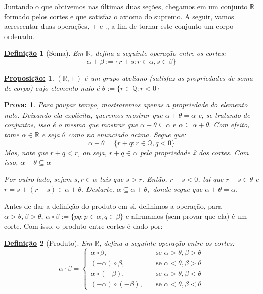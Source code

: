 \documentclass{article}
\newtheorem*{proposition*}{\underline{Proposi\c c\~ao:}}
\newtheorem{definition}{\underline{Defini\c c\~ao}}
\newtheorem*{proof*}{\underline{Prova:}}
\begin{document}
Juntando o que obtivemos nas \'ultimas duas se\c c\~oes, chegamos em um conjunto $\mathbb{R}$ formado pelos cortes e que satisfaz o axioma do supremo. A seguir, vamos acrescentar duas opera\c c\~oes, + e ., a fim de tornar este conjunto um corpo ordenado.

\begin{definition}[Soma]
Em $\mathbb{R}$, defina a seguinte opera\c c\~ao entre os cortes:
$$
\alpha + \beta:= \{r + s: r\in\alpha, s\in\beta\}
$$
\end{definition}
\begin{proposition*}
$(\mathbb{R}, +)$ \'e um grupo abeliano (satisfaz as propriedades de soma de corpo) cujo elemento nulo \'e $\theta:=\{r\in\mathbb{Q}: r < 0\}$
\end{proposition*}
\begin{proof*}
Para poupar tempo, mostraremos apenas a propriedade do elemento nulo. Deixando ela expl\'icita, queremos mostrar que $\alpha + \theta = \alpha$ e, se tratando de conjuntos, isso \'e o mesmo que mostrar que $\alpha + \theta \subseteq \alpha \text{ e } \alpha \subseteq \alpha + \theta.$ Com efeito, tome $\alpha\in\mathbb{R}$ e seja $\theta$ como no enunciado acima. Segue que:
$$
\alpha + \theta = \{r + q: r\in\mathbb{Q}, q < 0\}
$$
Mas, note que $r + q < r$, ou seja, $r + q\in\alpha$ pela propriedade 2 dos cortes. Com isso, $\alpha + \theta \subseteq \alpha$

Por outro lado, sejam $s, r\in\alpha$ tais que $s > r$. Ent\~ao, $r - s < 0$, tal que $r - s\in\theta$ e $r = s + (r - s) \in\alpha + \theta.$ Destarte, $\alpha\subseteq\alpha + \theta,$ donde segue que $\alpha + \theta = \alpha$. 
\end{proof*}

Antes de dar a defini\c c\~ao do produto em si, definimos a opera\c c\~ao, para $\alpha > \theta, \beta > \theta$, $\alpha\circ\beta:=\{pq: p\in\alpha, q\in\beta\}$ e afirmamos (sem provar que ela) \'e um corte. Com isso, o produto entre cortes \'e dado por:

\begin{definition}[Produto]
Em $\mathbb{R}$, defina a seguinte opera\c c\~ao entre os cortes:
$$
\alpha\cdot\beta = \left\{\begin{array}{ll}
		\alpha\circ\beta, & \quad \text{se } \alpha > \theta, \beta > \theta \\
		(-\alpha)\circ\beta, & \quad \text{se } \alpha < \theta, \beta > \theta\\
		\alpha\circ(-\beta), & \quad \text{se } \alpha > \theta, \beta < \theta \\
		(-\alpha)\circ(-\beta), & \quad \text{se } \alpha < \theta, \beta < \theta
\end{array}\right.
$$
\end{definition}
\end{document}
